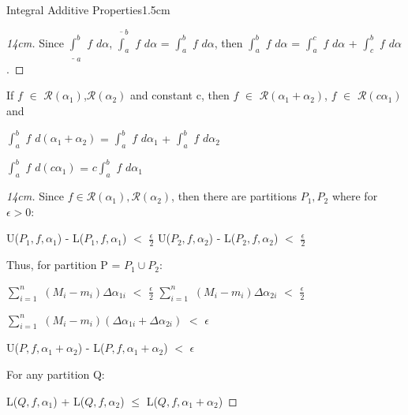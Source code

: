 \begin{ltheorem}{Integral Additive Properties}{1.5cm}
\begin{proof}[14cm]
            Since $\underline{\int}_a^b$ $f$ $d\alpha$,
            $\overline{\int}_a^b$ $f$ $d\alpha$
            = $\int_a^b$ $f$ $d\alpha$, then
            $\int_a^b$ $f$ $d\alpha$
            = $\int_a^c$ $f$ $d\alpha$ + $\int_c^b$ $f$ $d\alpha$.
        \end{proof}

    \item If $f$ $\in$ $\mathscr{R}(\alpha_1)$,$\mathscr{R}(\alpha_2)$ and
    constant c, then $f$ $\in$ $\mathscr{R}(\alpha_1+\alpha_2)$,
    $f$ $\in$ $\mathscr{R}(c\alpha_1)$ and

    \hspace{0.5cm}
    $\int_a^b$ $f$ $d(\alpha_1 + \alpha_2)$
    = $\int_a^b$ $f$ $d\alpha_1$ + $\int_a^b$ $f$ $d\alpha_2$

    \hspace{0.5cm}
    $\int_a^b$ $f$ $d(c\alpha_1)$
    = $c \int_a^b$ $f$ $d\alpha_1$

        \begin{proof}[14cm]
            Since $f \in \mathscr{R}(\alpha_1),\mathscr{R}(\alpha_2)$,
            then there are partitions $P_1,P_2$ where for $\epsilon > 0$:

            \hspace{0.5cm}
            U($P_1,f,\alpha_1$) - L($P_1,f,\alpha_1$) $<$ $\frac{\epsilon}{2}$
            \hspace{1cm}
            U($P_2,f,\alpha_2$) - L($P_2,f,\alpha_2$) $<$ $\frac{\epsilon}{2}$

            Thus, for partition P = $P_1 \cup P_2$:

            \hspace{0.5cm}
            $\sum_{i=1}^n$ $(M_i - m_i) \Delta \alpha_{1i}$
            $<$ $\frac{\epsilon}{2}$
            \hspace{1.5cm}
            $\sum_{i=1}^n$ $(M_i - m_i) \Delta \alpha_{2i}$
            $<$ $\frac{\epsilon}{2}$

            \hspace{2cm}
            $\sum_{i=1}^n$ $(M_i - m_i)
                            (\Delta \alpha_{1i} + \Delta \alpha_{2i})$
            $<$ $\epsilon$

            \hspace{2cm}
            U($P,f,\alpha_1+\alpha_2$) - L($P,f,\alpha_1+\alpha_2$)
            $<$ $\epsilon$

            For any partition Q:

            \hspace{0.5cm}
            L($Q,f,\alpha_1$) + L($Q,f,\alpha_2$)
            $\leq$ L($Q,f,\alpha_1+\alpha_2$)
            

\end{proof}
\end{ltheorem}
